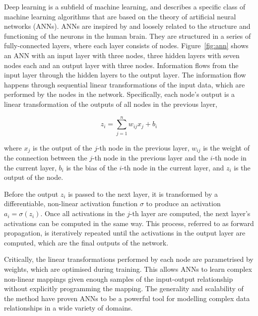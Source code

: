 \documentclass[a4paper]{article}
\begin{document}
Deep learning is a subfield of machine learning, and describes a specific class
of machine learning algorithms that are based on the theory of artificial neural
networks (ANNs). ANNs are inspired by and loosely related to the structure and
functioning of the neurons in the human brain. They are structured in a series
of fully-connected layers, where each layer consists of nodes.
Figure~\ref{fig:ann} shows an ANN with an input layer with three nodes, three
hidden layers with seven nodes each and an output layer with three nodes.
Information flows from the input layer through the hidden layers to the output
layer. The information flow happens through sequential linear transformations of
the input data, which are performed by the nodes in the network. Specifically,
each node's output is a linear transformation of the outputs of all nodes in the
previous layer, 

\begin{equation}
  z_{i} = \sum_{j=1}^{n} w_{ij} x_j + b_i
  \label{eq:perceptron}
\end{equation}

where $x_j$ is the output of the $j$-th node in the previous layer, $w_{ij}$ is
the weight of the connection between the $j$-th node in the previous layer and
the $i$-th node in the current layer, $b_i$ is the bias of the $i$-th node in
the current layer, and $z_i$ is the output of the node.

Before the output $z_i$ is passed to the next layer, it is transformed by a
differentiable, non-linear activation function $\sigma$ to produce an activation
$a_i = \sigma(z_i)$. Once all activations in the $j$-th layer are computed, the
next layer's activations can be computed in the same way. This process, referred
to as forward propagation, is iteratively repeated until the activations in the
output layer are computed, which are the final outputs of the network.

Critically, the linear transformations performed by each node are parametrised
by weights, which are optimised during training. This allows ANNs to learn
complex non-linear mappings given enough samples of the input-output
relationship without explicitly programming the mapping. The generality and
scalability of the method have proven ANNs to be a powerful tool for modelling
complex data relationships in a wide variety of domains.
\end{document}
